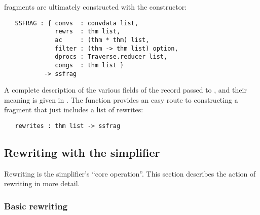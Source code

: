 \Simpset{} fragments are ultimately constructed with the 
constructor:
\begin{hol}
\begin{verbatim}
   SSFRAG : { convs  : convdata list,
              rewrs  : thm list,
              ac     : (thm * thm) list,
              filter : (thm -> thm list) option,
              dprocs : Traverse.reducer list,
              congs  : thm list }
           -> ssfrag
\end{verbatim}
\end{hol}
A complete description of the various fields of the record passed to
, and their meaning is given in \REFERENCE.  The
 function provides an easy route to constructing a
fragment that just includes a list of rewrites:
\begin{hol}
\begin{verbatim}
   rewrites : thm list -> ssfrag
\end{verbatim}
\end{hol}

\subsection{Rewriting with the simplifier}
\label{sec:simplifier-rewriting}

Rewriting is the simplifier's ``core operation''.  This section
describes the action of rewriting in more detail.


\subsubsection{Basic rewriting}
\label{sec:basic-rewriting}

